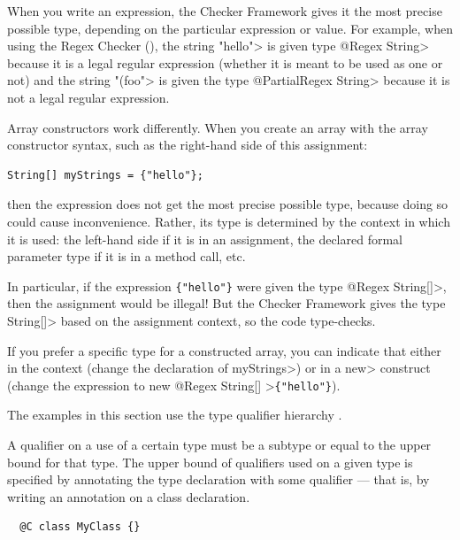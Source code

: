 
When you write an expression, the Checker Framework gives it the most
precise possible type, depending on the particular expression or value.
For example, when using the Regex Checker (),
the string \<"hello"> is given type \<@Regex String> because it is a legal
regular expression (whether it is meant to be used as one or not) and the
string \<"(foo"> is given the type \<@PartialRegex String> because it is not
a legal regular expression.

Array constructors work differently.  When you create an array with the
array constructor syntax, such as the right-hand side of this assignment:

\begin{Verbatim}
String[] myStrings = {"hello"};
\end{Verbatim}

\noindent
then the expression does not get the most precise possible type, because
doing so could cause inconvenience.  Rather, its type is determined by the
context in which it is used:  the left-hand side if it is in an assignment,
the declared formal parameter type if it is in a method call, etc.

In particular, if the expression \verb|{"hello"}| were given the type
\<@Regex String[]>, then the assignment would be illegal!  But the Checker
Framework gives the type \<String[]> based on the assignment context, so the code
type-checks.

If you prefer a specific type for a constructed array, you can indicate
that either in the context (change the declaration of \<myStrings>) or in a
\<new> construct (change the expression to \<new @Regex String[] >\verb|{"hello"}|).



The examples in this section use the type qualifier hierarchy .

A qualifier on a use of a certain type must be a subtype or equal to the upper bound for that type.
The upper bound of qualifiers used on a given type is specified by annotating the type declaration
with some qualifier --- that is, by writing an annotation on a class declaration.
\begin{Verbatim}
  @C class MyClass {}
\end{Verbatim}

